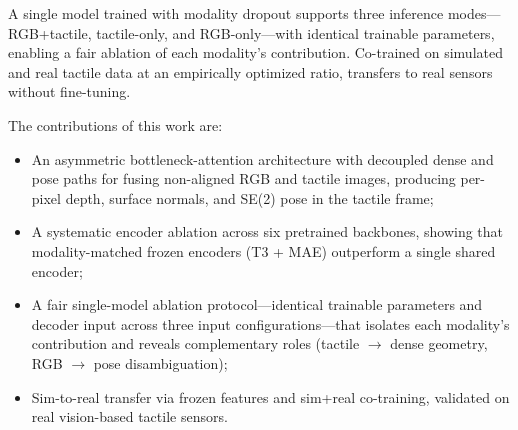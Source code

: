 A single model trained with modality dropout supports three inference
modes---RGB+tactile, tactile-only, and RGB-only---with identical trainable
parameters, enabling a fair ablation of each modality's contribution.
Co-trained on simulated and real tactile data at an empirically optimized
ratio, \method{} transfers to real sensors without fine-tuning.

The contributions of this work are:
\begin{itemize}
\item An asymmetric bottleneck-attention architecture with decoupled dense and
      pose paths for fusing non-aligned RGB and tactile images, producing
      per-pixel depth, surface normals, and SE(2) pose in the tactile frame;
\item A systematic encoder ablation across six pretrained backbones, showing
      that modality-matched frozen encoders (T3 + MAE) outperform a single
      shared encoder;
\item A fair single-model ablation protocol---identical trainable parameters
      and decoder input across three input configurations---that isolates each
      modality's contribution and reveals complementary roles (tactile
      $\rightarrow$ dense geometry, RGB $\rightarrow$ pose disambiguation);
\item Sim-to-real transfer via frozen features and sim+real co-training,
      validated on real vision-based tactile sensors. 
\end{itemize}
